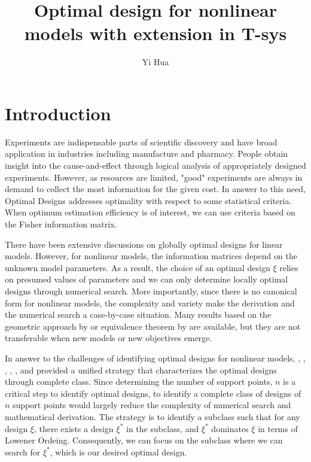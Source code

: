 \documentclass[11pt]{amsart}
\title{Optimal design for nonlinear models with extension in T-sys}
\author{Yi Hua}
\theoremstyle{definition}
\theoremstyle{remark}
\numberwithin{equation}{section}
\begin{document}
\maketitle

\section{Introduction}

Experiments are indispensable parts of scientific discovery and have broad application in industries including manufacture and pharmacy. People obtain insight into the cause-and-effect through logical analysis of appropriately designed experiments. However, as resources are limited, "good" experiments are always in demand to collect the most information for the given cost. In answer to this need, Optimal Designs addresses optimality with respect to some statistical criteria. When optimum estimation efficiency is of interest, we can use criteria based on the Fisher information matrix.


There have been extensive discussions on globally optimal designs for linear models. However, for nonlinear models, the information matrices depend on the unknown model parameters. As a result, the choice of an optimal design $\xi$ relies on presumed values of parameters and we can only determine locally optimal designs through numerical search. More importantly, since there is no canonical form for nonlinear models, the complexity and variety make the derivation and the numerical search a case-by-case situation. Many results based on the geometric approach by \cite{elfving1952} or equivalence theorem by \cite{kiefer1960} are available, but they are not transferable when new models or new objectives emerge. 

In answer to the challenges of identifying optimal designs for nonlinear models, \cite{dette2006}, \cite{yang2009}, \cite{yang2010}, \cite{dette2011}, \cite{yang2012}, and \cite{dette2013} provided a unified strategy that characterizes the optimal designs through complete class. Since determining the number of support points, $n$ is a critical step to identify optimal designs, to identify a complete class of designs of $n$ support points would largely reduce the complexity of numerical search and mathematical derivation. The strategy is to identify a subclass such that for any design $\xi$, there exists a design $\xi^*$ in the subclass, and $\xi^*$ dominates $\xi$ in terms of Lowener Ordeing. Consequently, we can focus on the subclass where we can search for $\xi^*$, which is our desired optimal design.
\end{document}
